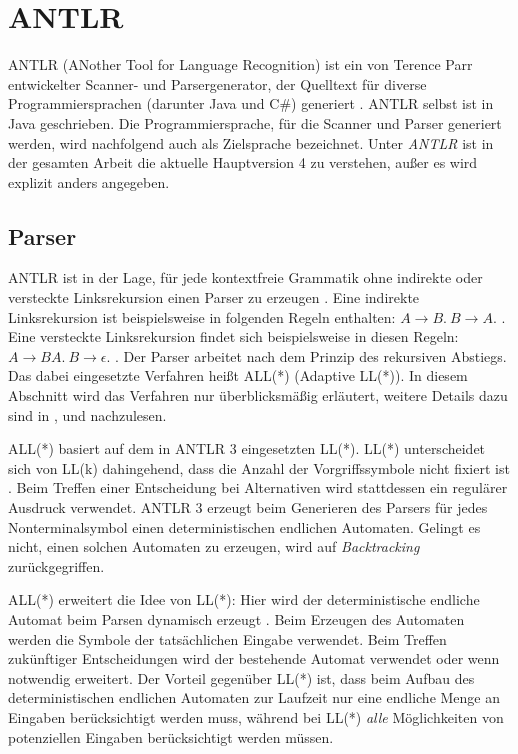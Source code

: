 \section{ANTLR}

ANTLR (ANother Tool for Language Recognition) ist ein von Terence Parr entwickelter Scanner- und Parsergenerator, der Quelltext für diverse Programmiersprachen (darunter Java und C\#{}) generiert \cite{ANTLR4Reference} \cite{ANTLRWebsite}. ANTLR selbst ist in Java geschrieben. Die Programmiersprache, für die Scanner und Parser generiert werden, wird nachfolgend auch als Zielsprache bezeichnet. Unter \emph{ANTLR} ist in der gesamten Arbeit die aktuelle Hauptversion 4 zu verstehen, außer es wird explizit anders angegeben.

\subsection{Parser}

ANTLR ist in der Lage, für jede kontextfreie Grammatik ohne indirekte oder versteckte Linksrekursion einen Parser zu erzeugen \cite{ANTLRALLStar}. Eine indirekte Linksrekursion ist beispielsweise in folgenden Regeln enthalten: $A \rightarrow B.\ B \rightarrow A.$ \cite{ANTLRALLStar}. Eine versteckte Linksrekursion findet sich beispielsweise in diesen Regeln: $A \rightarrow B A.\ B \rightarrow \epsilon.$ \cite{ANTLRALLStar}. Der Parser arbeitet nach dem Prinzip des rekursiven Abstiegs. Das dabei eingesetzte Verfahren heißt ALL(*) (Adaptive LL(*)). In diesem Abschnitt wird das Verfahren nur überblicksmäßig erläutert, weitere Details dazu sind in \cite{ANTLR4Reference}, \cite{ANTLRLLStar} und \cite{ANTLRALLStar} nachzulesen.

ALL(*) basiert auf dem in ANTLR 3 eingesetzten LL(*). LL(*) unterscheidet sich von LL(k) dahingehend, dass die Anzahl der Vorgriffssymbole nicht fixiert ist \cite{ANTLRLLStar}. Beim Treffen einer Entscheidung bei Alternativen wird stattdessen ein regulärer Ausdruck verwendet. ANTLR 3 erzeugt beim Generieren des Parsers für jedes Nonterminalsymbol einen deterministischen endlichen Automaten. Gelingt es nicht, einen solchen Automaten zu erzeugen, wird auf \emph{Backtracking} zurückgegriffen.

ALL(*) erweitert die Idee von LL(*): Hier wird der deterministische endliche Automat beim Parsen dynamisch erzeugt \cite{ANTLRALLStar}. Beim Erzeugen des Automaten werden die Symbole der tatsächlichen Eingabe verwendet. Beim Treffen zukünftiger Entscheidungen wird der bestehende Automat verwendet oder wenn notwendig erweitert. Der Vorteil gegenüber LL(*) ist, dass beim Aufbau des deterministischen endlichen Automaten zur Laufzeit nur eine endliche Menge an Eingaben berücksichtigt werden muss, während bei LL(*) \emph{alle} Möglichkeiten von potenziellen Eingaben berücksichtigt werden müssen.

